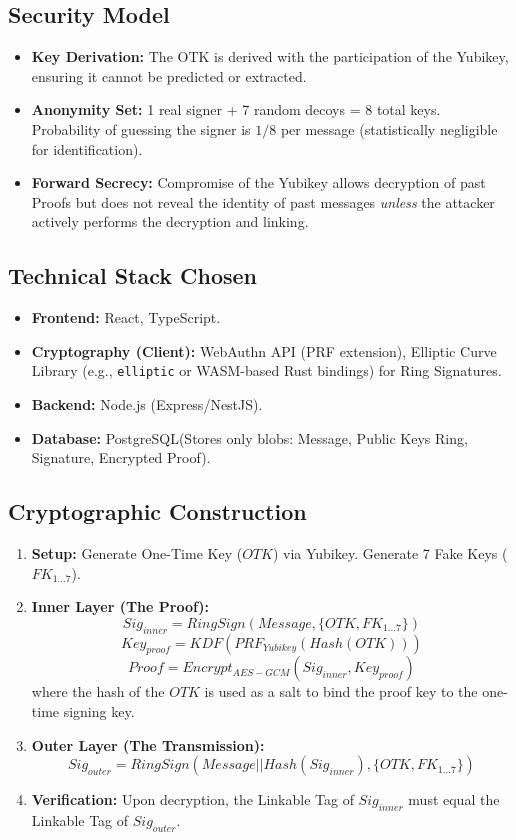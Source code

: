 \documentclass[letterpaper,11pt]{article}
\begin{document}
\subsection{Security Model}
\begin{itemize}
    \item \textbf{Key Derivation:} The OTK is derived with the participation of the Yubikey, ensuring it cannot be predicted or extracted.
    \item \textbf{Anonymity Set:} 1 real signer + 7 random decoys = 8 total keys. Probability of guessing the signer is $1/8$ per message (statistically negligible for identification).
    \item \textbf{Forward Secrecy:} Compromise of the Yubikey allows decryption of past Proofs but does not reveal the identity of past messages \textit{unless} the attacker actively performs the decryption and linking.
\end{itemize}

\subsection{Technical Stack Chosen}
\begin{itemize}
    \item \textbf{Frontend:} React, TypeScript.
    \item \textbf{Cryptography (Client):} WebAuthn API (PRF extension), Elliptic Curve Library (e.g., \texttt{elliptic} or WASM-based Rust bindings) for Ring Signatures.
    \item \textbf{Backend:} Node.js (Express/NestJS).
    \item \textbf{Database:} PostgreSQL(Stores only blobs: Message, Public Keys Ring, Signature, Encrypted Proof).
\end{itemize}

\subsection{Cryptographic Construction}
\begin{enumerate}
    \item \textbf{Setup:} Generate One-Time Key ($OTK$) via Yubikey. Generate 7 Fake Keys ($FK_{1...7}$).
    \item \textbf{Inner Layer (The Proof):}
    $$ Sig_{inner} = RingSign(Message, \{OTK, FK_{1...7}\}) $$
    $$ Key_{proof} = KDF(PRF_{Yubikey}(Hash(OTK))) $$
    $$ Proof = Encrypt_{AES-GCM}(Sig_{inner}, Key_{proof}) $$
    where the hash of the $OTK$ is used as a salt to bind the proof key to the one-time signing key.
    \item \textbf{Outer Layer (The Transmission):}
    $$ Sig_{outer} = RingSign(Message || Hash(Sig_{inner}), \{OTK, FK_{1...7}\}) $$
    \item \textbf{Verification:} Upon decryption, the Linkable Tag of $Sig_{inner}$ must equal the Linkable Tag of $Sig_{outer}$.
\end{enumerate}
\end{document}
